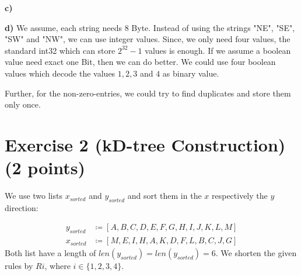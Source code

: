 \documentclass[english, fontsize=12pt, paper=a4, twoside=false, draft=true, pagesize=auto, version=last, DIV=16]{scrartcl}
\theoremstyle{break}
\begin{document}
\textbf{c)}
\vspace*{3mm}

\textbf{d)}
We assume, each string needs 8 Byte. Instead of using the strings "NE", "SE", "SW" and "NW", we can use integer values. Since, we only need four values, the standard int32 which can store $2^{32}-1$ values is enough. If we assume a boolean value need exact one Bit, then we can do better. We could use four boolean values which decode the values $1,2,3$ and $4$ as binary value. \par
Further, for the non-zero-entries, we could try to find duplicates and store them only once.

\vspace*{10mm}
\newpage




\section*{\large Exercise 2 (kD-tree Construction) {\normalsize \hfill (2 points)}}
\vspace*{10mm}
We use two lists $x_{sorted}$ and $y_{sorted}$ and sort them in the $x$ respectively the $y$ direction: \par
\begin{equation}
\begin{aligned}
y_{sorted} & \coloneqq [A,B,C,D,E,F,G,H,I,J,K,L,M] \\[3pt]
x_{sorted} & \coloneqq [M,E,I,H,A,K,D,F,L,B,C,J,G]
\end{aligned}
\end{equation}
Both list have a length of $len(y_{sorted}) = len(y_{sorted}) = 6$. We shorten the given rules by $Ri$, where $i \in \{1,2,3,4\}$. \par
\vspace*{15mm}
\end{document}
